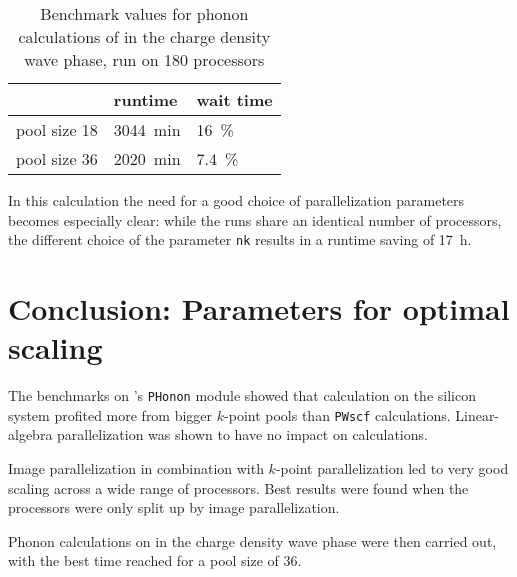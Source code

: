 \documentclass[main.tex]{subfiles}
\begin{document}
\begin{table}
    \caption{Benchmark values for phonon calculations of \TaS in the charge density wave phase, run on 180 processors}
    \begin{tabular}{@{}lll@{}}
    \toprule
                 & runtime            & wait time \\ \midrule
    pool size 18 & \SI{3044}{\minute} & \SI{16}{\percent}         \\
    pool size 36 & \SI{2020}{\minute} & \SI{7.4}{\percent}
    \end{tabular}
    \label{tab:tas2_cdw_phonon_times}
\end{table}
In this calculation the need for a good choice of parallelization parameters becomes especially clear:
while the runs share an identical number of processors, the different choice of the parameter \texttt{nk} results in a runtime saving of \SI{17}{\hour}.

\section{Conclusion: Parameters for optimal scaling}

The benchmarks on \QE's \texttt{PHonon} module showed that calculation on the silicon system profited more from bigger \(k\)-point pools than \texttt{PWscf} calculations.
Linear-algebra parallelization was shown to have no impact on calculations.

Image parallelization in combination with \(k\)-point parallelization led to very good scaling across a wide range of processors.
Best results were found when the processors were only split up by image parallelization.

Phonon calculations on \TaS in the charge density wave phase were then carried out, with the best time reached for a pool size of 36.
\end{document}

